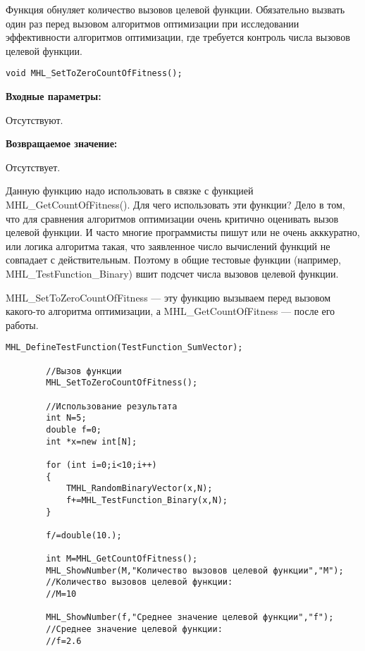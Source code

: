 \documentclass[a4paper,12pt]{article}
\begin{document}
Функция обнуляет количество вызовов целевой функции. Обязательно вызвать один раз перед вызовом алгоритмов оптимизации при исследовании эффективности    алгоритмов оптимизации, где требуется контроль числа вызовов целевой функции.


\begin{lstlisting}[label=code_syntax_MHL_SetToZeroCountOfFitness,caption=Синтаксис]
void MHL_SetToZeroCountOfFitness();
\end{lstlisting}

\textbf{Входные параметры:}

Отсутствуют.

\textbf{Возвращаемое значение:}
 
Отсутствует.

Данную функцию надо использовать в связке с функцией MHL\_GetCountOfFitness(). Для чего использовать эти функции? Дело в том, что для сравнения алгоритмов оптимизации очень критично оценивать вызов целевой функции. И часто многие программисты пишут или не очень акккуратно, или логика алгоритма такая, что заявленное число вычислений функций не совпадает с действительным. Поэтому в общие тестовые функции (например, MHL\_TestFunction\_Binary) вшит подсчет числа вызовов целевой функции.

MHL\_SetToZeroCountOfFitness --- эту функцию вызываем перед вызовом какого-то алгоритма оптимизации, а MHL\_GetCountOfFitness --- после его работы.


\begin{lstlisting}[label=code_use_MHL_SetToZeroCountOfFitness,caption=Пример использования]
        MHL_DefineTestFunction(TestFunction_SumVector);

        //Вызов функции
        MHL_SetToZeroCountOfFitness();

        //Использование результата
        int N=5;
        double f=0;
        int *x=new int[N];

        for (int i=0;i<10;i++)
        {
            TMHL_RandomBinaryVector(x,N);
            f+=MHL_TestFunction_Binary(x,N);
        }

        f/=double(10.);

        int M=MHL_GetCountOfFitness();
        MHL_ShowNumber(M,"Количество вызовов целевой функции","M");
        //Количество вызовов целевой функции:
        //M=10

        MHL_ShowNumber(f,"Среднее значение целевой функции","f");
        //Среднее значение целевой функции:
        //f=2.6
\end{lstlisting}
\end{document}
